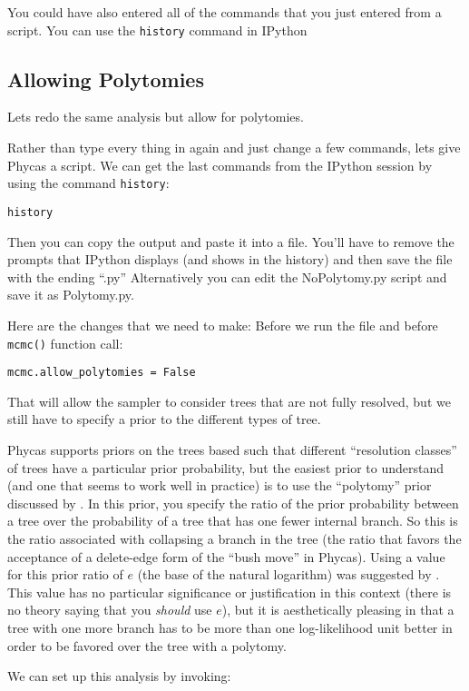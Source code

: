 \documentclass{article}
\newcommand{\cmd}[1]{\texttt{#1}\xspace}
\newcommand{\phycas}{Phycas\xspace}
\newcommand{\localfile}[1]{\textsf{#1}\xspace}
\begin{document}
You could have also entered all of the commands that you just entered from a script. 
You can use the \cmd{history} command in IPython 

\subsection{Allowing Polytomies}
Lets redo the same analysis but allow for polytomies.

Rather than type every thing in again and just change a few commands, lets give \phycas a script.
We can get the last commands from the IPython session by using the command \cmd{history}:
\begin{verbatim}
history
\end{verbatim}
Then you can copy the output and paste it into a file.  
You'll have to remove the prompts that IPython displays (and shows in the history) and then save the file with the ending ``.py''
Alternatively you can edit the \localfile{NoPolytomy.py} script and save it as  \localfile{Polytomy.py}.

Here are the changes that we need to make:
Before we run the file and before \cmd{mcmc()} function call:
\begin{verbatim}
mcmc.allow_polytomies = False
\end{verbatim}
That will allow the sampler to consider trees that are not fully resolved, 
but we still have to specify a prior to the different types of tree.

\phycas supports priors on the trees based such that different ``resolution classes'' of trees have a particular prior probability, but the easiest prior to understand (and one that seems to work well in practice) is to use the ``polytomy'' prior discussed by \citet{LewisHH2005}.
In this prior, you specify the ratio of the prior probability between a tree over the probability of a tree that has one fewer internal branch.
So this is the ratio associated with collapsing a branch in the tree (the ratio that favors the 
acceptance of a delete-edge form of the ``bush move'' in \phycas).
Using a value for this prior ratio of $e$ (the base of the natural logarithm) was 
suggested by \citet{LewisHH2005}.
This value has no particular significance or justification in this
context (there is no theory saying that you {\em should} use $e$),
 but it is aesthetically pleasing in that a tree with one more
branch has to be more than one log-likelihood unit better in
order to be favored over the tree with a polytomy.

We can set up this analysis by invoking:
\end{document}
